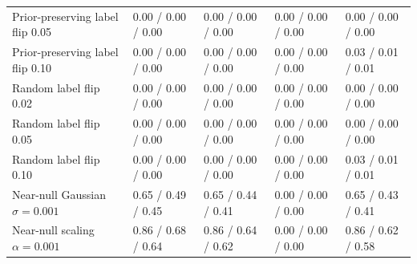 \begin{table}[!tbp]
\begin{tabular}{@{}lllll@{}}
Prior-preserving label flip 0.05 & 0.00 / 0.00 / 0.00 & 0.00 / 0.00 / 0.00 & 0.00 / 0.00 / 0.00 & 0.00 / 0.00 / 0.00 \\
Prior-preserving label flip 0.10 & 0.00 / 0.00 / 0.00 & 0.00 / 0.00 / 0.00 & 0.00 / 0.00 / 0.00 & 0.03 / 0.01 / 0.01 \\
Random label flip 0.02 & 0.00 / 0.00 / 0.00 & 0.00 / 0.00 / 0.00 & 0.00 / 0.00 / 0.00 & 0.00 / 0.00 / 0.00 \\
Random label flip 0.05 & 0.00 / 0.00 / 0.00 & 0.00 / 0.00 / 0.00 & 0.00 / 0.00 / 0.00 & 0.00 / 0.00 / 0.00 \\
Random label flip 0.10 & 0.00 / 0.00 / 0.00 & 0.00 / 0.00 / 0.00 & 0.00 / 0.00 / 0.00 & 0.03 / 0.01 / 0.01 \\
\midrule
Near-null Gaussian $\sigma=0.001$ & 0.65 / 0.49 / 0.45 & 0.65 / 0.44 / 0.41 & 0.00 / 0.00 / 0.00 & 0.65 / 0.43 / 0.41 \\
Near-null scaling $\alpha=0.001$ & 0.86 / 0.68 / 0.64 & 0.86 / 0.64 / 0.62 & 0.00 / 0.00 / 0.00 & 0.86 / 0.62 / 0.58 \\
\bottomrule
\end{tabular}
\end{table}
